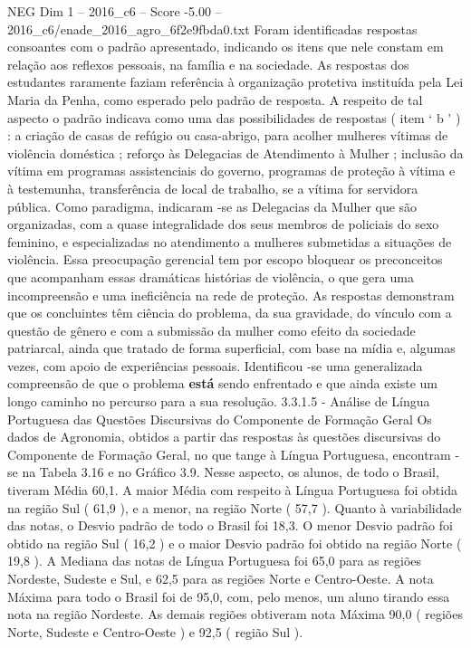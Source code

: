 \begin{textsample}{NEG Dim 1 – 2016\_c6 – Score -5.00 – 2016\_c6/enade\_2016\_agro\_6f2e9fbda0.txt}
Foram identificadas respostas consoantes com o padrão apresentado, indicando os itens que nele constam em relação aos reflexos pessoais, na família e na sociedade.
As respostas dos estudantes raramente faziam referência à organização protetiva instituída pela Lei Maria da Penha, como esperado pelo padrão de resposta.
A respeito de tal aspecto o padrão indicava como uma das possibilidades de respostas ( item ‘ b ’ ) : a criação de casas de refúgio ou casa-abrigo, para acolher mulheres vítimas de violência doméstica ; reforço às Delegacias de Atendimento à Mulher ; inclusão da vítima em programas assistenciais do governo, programas de proteção à vítima e à testemunha, transferência de local de trabalho, se a vítima for servidora pública.
Como paradigma, indicaram -se as Delegacias da Mulher que são organizadas, com a quase integralidade dos seus membros de policiais do sexo feminino, e especializadas no atendimento a mulheres submetidas a situações de violência.
Essa preocupação gerencial tem por escopo bloquear os preconceitos que acompanham essas dramáticas histórias de violência, o que gera uma incompreensão e uma ineficiência na rede de proteção.
As respostas demonstram que os concluintes têm ciência do problema, da sua gravidade, do vínculo com a questão de gênero e com a submissão da mulher como efeito da sociedade patriarcal, ainda que tratado de forma superficial, com base na mídia e, algumas vezes, com apoio de experiências pessoais.
Identificou -se uma generalizada compreensão de que o problema \textbf{está} sendo enfrentado e que ainda existe um longo caminho no percurso para a sua resolução. 3.3.1.5 - Análise de Língua Portuguesa das Questões Discursivas do Componente de Formação Geral Os dados de Agronomia, obtidos a partir das respostas às questões discursivas do Componente de Formação Geral, no que tange à Língua Portuguesa, encontram -se na Tabela 3.16 e no Gráfico 3.9.
Nesse aspecto, os alunos, de todo o Brasil, tiveram Média 60,1.
A maior Média com respeito à Língua Portuguesa foi obtida na região Sul ( 61,9 ), e a menor, na região Norte ( 57,7 ).
Quanto à variabilidade das notas, o Desvio padrão de todo o Brasil foi 18,3.
O menor Desvio padrão foi obtido na região Sul ( 16,2 ) e o maior Desvio padrão foi obtido na região Norte ( 19,8 ).
A Mediana das notas de Língua Portuguesa foi 65,0 para as regiões Nordeste, Sudeste e Sul, e 62,5 para as regiões Norte e Centro-Oeste.
A nota Máxima para todo o Brasil foi de 95,0, com, pelo menos, um aluno tirando essa nota na região Nordeste.
As demais regiões obtiveram nota Máxima 90,0 ( regiões Norte, Sudeste e Centro-Oeste ) e 92,5 ( região Sul ).

\end{textsample}
